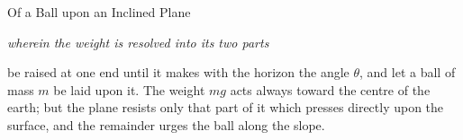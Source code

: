 \documentclass[11pt]{article}
\begin{document}
\begin{center}
  {\small{}}\par
  \vspace{.3em}
  {\Large Of a Ball upon an Inclined Plane}\par
  \vspace{.2em}
  {\itshape wherein the weight is resolved into its two parts}
\end{center}

\vspace{.9em}

\noindent{} be raised at one end until it
makes with the horizon the angle $\theta$, and let a ball of mass $m$ be laid
upon it. The weight $mg$ acts always toward the centre of the earth; but the
plane resists only that part of it which presses directly upon the surface,
and the remainder urges the ball along the slope.
\end{document}
